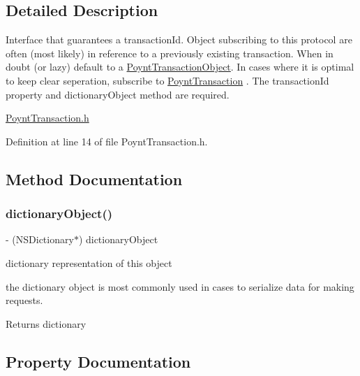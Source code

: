 \subsection{Detailed Description}
Interface that guarantees a {\ttfamily transaction\+Id}. Object subscribing to this protocol are often (most likely) in reference to a previously existing transaction. When in doubt (or lazy) default to a \hyperlink{interface_poynt_transaction_object}{Poynt\+Transaction\+Object}. In cases where it is optimal to keep clear seperation, subscribe to \hyperlink{class_poynt_transaction-p}{Poynt\+Transaction} . The transaction\+Id property and dictionary\+Object method are required. 

\hyperlink{_poynt_transaction_8h}{Poynt\+Transaction.\+h} 

Definition at line 14 of file Poynt\+Transaction.\+h.



\subsection{Method Documentation}
\hypertarget{protocol_poynt_transaction_01-p_a2482f2e9af7fe8eec4ba9710cdc963ee}{}\label{protocol_poynt_transaction_01-p_a2482f2e9af7fe8eec4ba9710cdc963ee} 
\subsubsection{\texorpdfstring{dictionary\+Object()}{dictionaryObject()}}
{\footnotesize\ttfamily -\/ (N\+S\+Dictionary$\ast$) dictionary\+Object \begin{DoxyParamCaption}{ }\end{DoxyParamCaption}}



dictionary representation of this object 

the dictionary object is most commonly used in cases to serialize data for making requests.

\begin{DoxyReturn}{Returns}
dictionary 
\end{DoxyReturn}


\subsection{Property Documentation}
\hypertarget{protocol_poynt_transaction_01-p_aacd11580c330a78310c344d78baecf8c}{}\label{protocol_poynt_transaction_01-p_aacd11580c330a78310c344d78baecf8c} 
